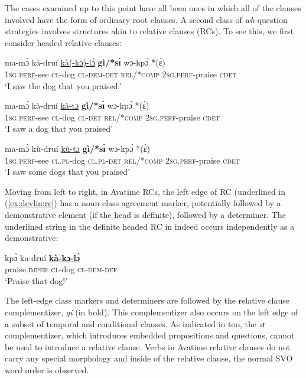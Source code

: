 \documentclass[output=paper]{langscibook}
\begin{document}
The cases examined up to this point have all been ones in which all of the clauses involved have the form of ordinary root clauses.  A second class of \textit{wh}-question strategies involves structures akin to relative clauses (RCs).  To see this, we first consider headed relative clauses:


\ea\label{ex:devlin:rc}
\begin{xlist}
\ex \label{ex:devlin:rc-def}
\gll ma-m\`{ɔ} k\`{a}-dru\'{i} \uline{k\`{a}(-kɔ)-l\`{ɔ}} \textbf{g\`{i}/*s\`{ɪ}} wɔ-kp\'{ɔ} *(\`{ɛ})\\
\textsc{1sg.perf}-see \textsc{cl}-dog \textsc{cl}-\textsc{dem}-\textsc{det} \textsc{rel}/*\textsc{comp} \textsc{2sg.perf}-praise \textsc{cdet} \\
\glt `I saw the dog that you praised.'

\ex\label{ex:devlin:rc-indef}
\gll ma-m\`{ɔ} k\`{a}-dru\'{i} \uline{k\`{a}-tɔ} \textbf{g\`{i}/*s\`{ɪ}} wɔ-kp\'{ɔ} *(\`{ɛ}) \\
\textsc{1sg.perf}-see \textsc{cl}-dog \textsc{cl}-\textsc{det} \textsc{rel}/*\textsc{comp} \textsc{2sg.perf}-praise \textsc{cdet}  \\
\glt `I saw a dog that you praised’

\ex\label{ex:devlin:rc-plural}
\gll ma-m\`{ɔ} k\`{u}-dru\'{i} \uline{k\`{u}-tɔ} \textbf{g\`{i}/*s\`{ɪ}} wɔ-kp\'{ɔ} *(\`{ɛ})\\
\textsc{1sg.perf}-see \textsc{cl.pl}-dog \textsc{cl.pl}-\textsc{det} \textsc{rel}/*\textsc{comp} \textsc{2sg.perf}-praise \textsc{cdet}  \\
\glt `I saw some dogs that you praised’
\end{xlist}
\z

Moving from left to right, in Avatime RCs, the left edge of RC (underlined in (\ref{ex:devlin:rc}) has a noun class agreement marker, potentially followed by a demonstrative element (if the head is definite), followed by a determiner.  The underlined string in the definite headed RC in  indeed occurs independently as a demonstrative:

\ea \label{ex:devlin:demonstrative}
\gll kp\`{ɔ} ka-dru\'{i} \textbf{\uline{k\`{a}-kɔ-l\`{ɔ}}}   \\
praise.\textsc{imper} \textsc{cl}-dog \textsc{cl}-\textsc{dem}-\textsc{def}\\
\glt `Praise that dog!’
\z



The left-edge class markers and determiners are followed by the relative clause complementizer, \textit{gi} (in bold).  This complementizer also occurs on the left edge of a subset of temporal and conditional clauses.  As indicated in  too, the \textit{sɪ} complementizer, which introduces embedded propositions and questions, cannot be used to introduce a relative clause.  Verbs in Avatime relative clauses do not carry any special morphology and inside of the relative clause, the normal SVO word order is observed. 
\end{document}
